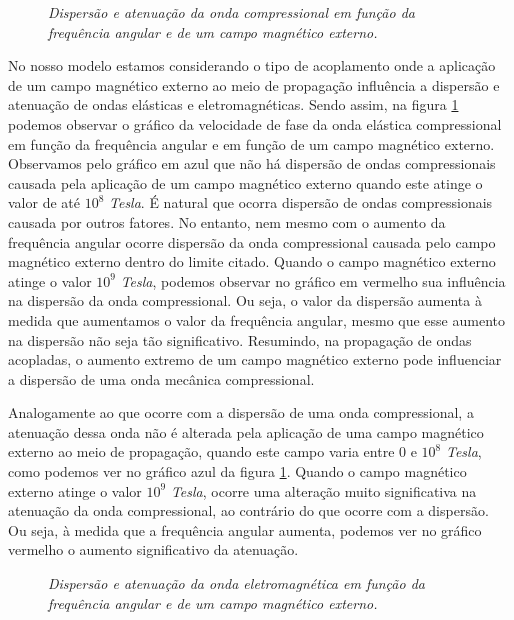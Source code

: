 \begin{figure}
\centering
{}
\caption{\textit{Dispers\~ao e atenua\c{c}\~ao da onda compressional em fun\c{c}\~ao da frequ\^encia angular e de um campo magn\'etico externo.}}
\label{fig.disp_P}
\end{figure}


No nosso modelo estamos considerando o tipo de acoplamento onde a aplica\c{c}\~ao de um campo magn\'etico externo ao meio de propaga\c{c}\~ao influ\^encia a dispers\~ao e atenua\c{c}\~ao de ondas el\'asticas e eletromagn\'eticas. Sendo assim, na figura \ref{fig.disp_P} podemos observar o gr\'afico da velocidade de fase da onda el\'astica compressional em fun\c{c}\~ao da frequ\^encia angular e em fun\c{c}\~ao de um campo magn\'etico externo. Observamos pelo gr\'afico em azul que n\~ao h\'a dispers\~ao de ondas compressionais causada pela aplica\c{c}\~ao de um campo magn\'etico externo quando este atinge o valor de at\'e $10^8$ \textit{Tesla}. \'E natural que ocorra dispers\~ao de ondas compressionais causada por outros fatores. No entanto, nem mesmo com o aumento da frequ\^encia angular ocorre dispers\~ao da onda compressional causada pelo campo magn\'etico externo dentro do limite citado. Quando o campo magn\'etico externo atinge o valor $10^9$ \textit{Tesla}, podemos observar no gr\'afico em vermelho sua influ\^encia na dispers\~ao da onda compressional. Ou seja, o valor da dispers\~ao aumenta \`a medida que aumentamos o valor da frequ\^encia angular, mesmo que esse aumento na dispers\~ao n\~ao seja t\~ao significativo. Resumindo, na propaga\c{c}\~ao de ondas acopladas, o aumento extremo de um campo magn\'etico externo pode influenciar a dispers\~ao de uma onda mec\^anica compressional.


Analogamente ao que ocorre com a dispers\~ao de uma onda compressional, a atenua\c{c}\~ao dessa onda n\~ao \'e alterada pela aplica\c{c}\~ao de uma campo magn\'etico externo ao meio de propaga\c{c}\~ao, quando este campo varia entre 0 e $10^8$ \textit{Tesla}, como podemos ver no gr\'afico azul da figura \ref{fig.disp_P}. Quando o campo magn\'etico externo atinge o valor $10^9$ \textit{Tesla}, ocorre uma altera\c{c}\~ao muito significativa na atenua\c{c}\~ao da onda compressional, ao contr\'ario do que ocorre com a dispers\~ao. Ou seja, \`a medida que a frequ\^encia angular aumenta, podemos ver no gr\'afico vermelho o aumento significativo da atenua\c{c}\~ao.

\begin{figure}
\centering
{}
\caption{\textit{Dispers\~ao e atenua\c{c}\~ao da onda eletromagn\'etica em fun\c{c}\~ao da frequ\^encia angular e de um campo magn\'etico externo.}}
\label{fig.disp_em}
\end{figure}


